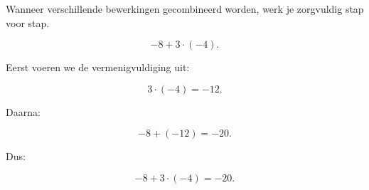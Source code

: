 \documentclass{ximera}
\begin{document}


Wanneer verschillende bewerkingen gecombineerd worden, werk je zorgvuldig
stap voor stap.

\begin{voorbeeld}

\[
-8+3\cdot(-4).
\]

Eerst voeren we de vermenigvuldiging uit:

\[
3\cdot(-4)=-12.
\]

Daarna:

\[
-8+(-12)=-20.
\]

Dus:

\[
-8+3\cdot(-4)=-20.
\]

\end{voorbeeld}
\end{document}
